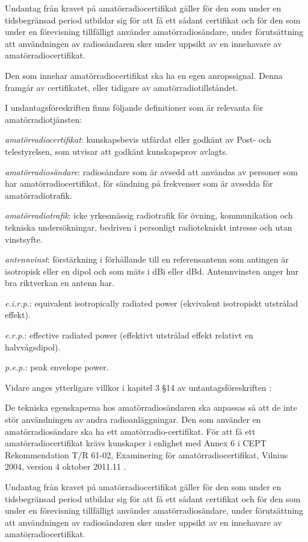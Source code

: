 Undantag från kravet på amatörradiocertifikat gäller för den som under en
tidsbegränsad period utbildar sig för att få ett sådant certifikat och för
den som under en förevisning tillfälligt använder amatörradiosändare, under
förutsättning att användningen av radiosändaren sker under uppsikt av en
innehavare av amatörradiocertifikat.

Den som innehar amatörradiocertifikat ska ha en egen anropssignal.
Denna framgår av certifikatet, eller tidigare av amatörradiotillståndet.

I undantagsföreskriften \cite{PTSFS2015:4} finns följande definitioner som är
relevanta för amatörradiotjänsten:

\emph{amatörradiocertifikat}: kunskapsbevis utfärdat eller godkänt av
Post- och telestyrelsen, som utvisar att godkänt kunskapsprov avlagts.

\emph{amatörradiosändare}: radiosändare som är avsedd att användas av personer
som har amatörradiocertifikat, för sändning på frekvenser som är avsedda för
amatörradiotrafik.

\emph{amatörradiotrafik}: icke yrkesmässig radiotrafik för övning,
kommunikation och tekniska undersökningar, bedriven i personligt radiotekniskt
intresse och utan vinstsyfte.

\emph{antennvinst}: förstärkning i förhållande till en referensantenn som
antingen är isotropisk eller en dipol och som mäts i dBi eller dBd.
Antennvinsten anger hur bra riktverkan en antenn har.

\emph{e.i.r.p.}: equivalent isotropically radiated power (ekvivalent
isotropiskt utstrålad effekt).

\emph{e.r.p.}: effective radiated power (effektivt utstrålad effekt relativt en
halvvågsdipol).

\emph{p.e.p.}: peak envelope power.

Vidare anges ytterligare villkor i kapitel 3 \S 14 av untantagsföreskriften \cite{PTSFS2015:4}:

De tekniska egenskaperna hos amatörradiosändaren ska anpassas så att de inte
stör användningen av andra radioanläggningar.
Den som använder en amatörradiosändare ska ha ett amatörradio-certifikat.
För att få ett amatörradiocertifikat krävs kunskaper i enlighet med Annex 6 i
CEPT Rekommendation T/R 61-02, Examinering för amatörradiocertifikat,
Vilnius 2004, version 4 oktober 2011.11 \cite{TR6102}.

Undantag från kravet på amatörradiocertifikat gäller för den som under en
tidsbegränsad period utbildar sig för att få ett sådant certifikat och för den
som under en förevisning tillfälligt använder amatörradiosändare, under
förutsättning att användningen av radiosändaren sker under uppsikt av en
innehavare av amatörradiocertifikat.

